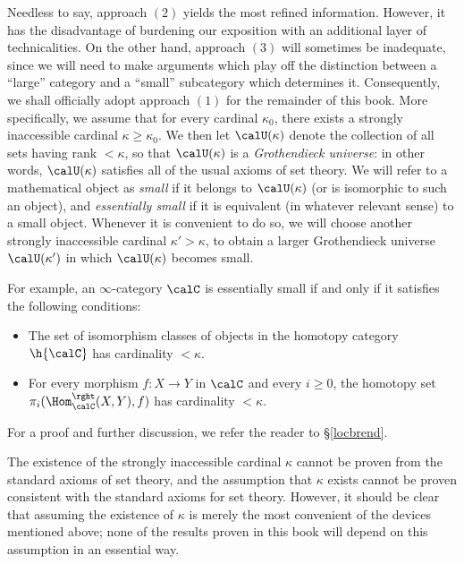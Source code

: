 Needless to say, approach $(2)$ yields the most refined information. However, it has the disadvantage of burdening our exposition with an additional layer of technicalities. On the other hand, approach $(3)$ will sometimes be inadequate, since we will need to make arguments which play off the distinction between a ``large'' category and a ``small'' subcategory which determines it. Consequently, we shall officially adopt approach $(1)$ for the remainder of this book. More specifically, we assume that for every
cardinal $\kappa_0$, there exists a strongly inaccessible cardinal $\kappa \geq \kappa_0$.
We then let $\calU(\kappa)$ denote the collection of all sets having rank $< \kappa$, so that
$\calU(\kappa)$ is a {\it Grothendieck universe}: in other words, $\calU(\kappa)$ satisfies all of the usual axioms of set theory. We will refer to a mathematical object as {\it small} if it belongs to $\calU(\kappa)$ (or is isomorphic to such an object), and {\it essentially small} if it is equivalent (in whatever relevant sense) to a small object. Whenever it is convenient to do so, we will choose another strongly inaccessible cardinal $\kappa' > \kappa$, to obtain a larger Grothendieck universe
$\calU(\kappa')$ in which $\calU(\kappa)$ becomes small.

For example, an $\infty$-category $\calC$ is essentially small if and only if it satisfies the following conditions:
\begin{itemize}
\item The set of isomorphism classes of objects in the homotopy
category $\h{\calC}$ has cardinality $< \kappa$.

\item For every morphism $f: X \rightarrow Y$ in $\calC$ and every $i \geq 0$, the homotopy
set $\pi_{i}( \Hom^{\rght}_{\calC}(X,Y), f)$ has cardinality $< \kappa$.
\end{itemize}

For a proof and further discussion, we refer the reader to \S \ref{locbrend}.

\begin{remark}
The existence of the strongly inaccessible cardinal $\kappa$ cannot be proven from the standard axioms of set theory, and the assumption that $\kappa$ exists cannot be proven consistent with the standard axioms for set theory. However, it should be clear that assuming the existence of $\kappa$ is merely the most convenient of the devices mentioned above; none of the results proven in this book will depend on this assumption in an essential way.
\end{remark}

